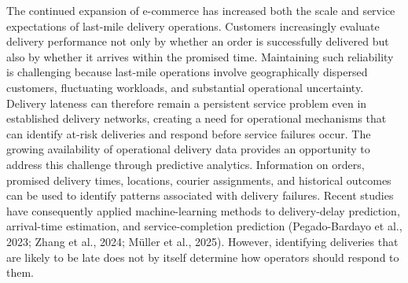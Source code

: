 \documentclass[
]{article}
\begin{document}
The continued expansion of e-commerce has increased both the scale and
service expectations of last-mile delivery operations. Customers
increasingly evaluate delivery performance not only by whether an order
is successfully delivered but also by whether it arrives within the
promised time. Maintaining such reliability is challenging because
last-mile operations involve geographically dispersed customers,
fluctuating workloads, and substantial operational uncertainty. Delivery
lateness can therefore remain a persistent service problem even in
established delivery networks, creating a need for operational
mechanisms that can identify at-risk deliveries and respond before
service failures occur. The growing availability of operational delivery
data provides an opportunity to address this challenge through
predictive analytics. Information on orders, promised delivery times,
locations, courier assignments, and historical outcomes can be used to
identify patterns associated with delivery failures. Recent studies have
consequently applied machine-learning methods to delivery-delay
prediction, arrival-time estimation, and service-completion prediction
(Pegado-Bardayo et al., 2023; Zhang et al., 2024; Müller et al., 2025).
However, identifying deliveries that are likely to be late does not by
itself determine how operators should respond to them.
\end{document}
